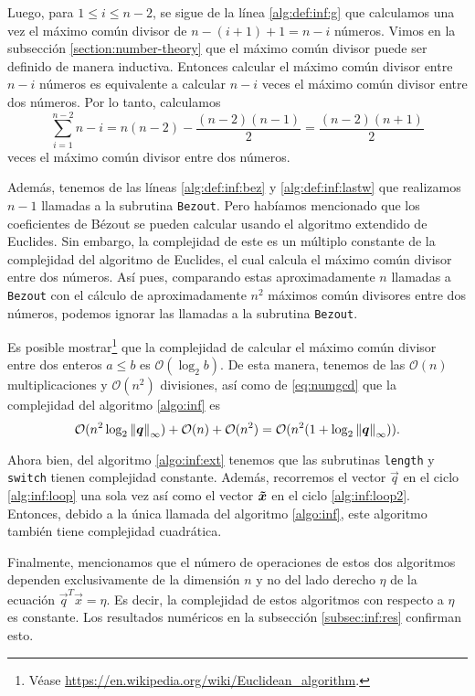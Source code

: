 Luego, para $1 \leq i \leq n - 2$, se sigue de la línea \ref{alg:def:inf:g} que calculamos una vez
el máximo común divisor de $n - (i + 1) + 1 = n - i$ números. Vimos en la subsección
\ref{section:number-theory} que el máximo común divisor puede ser definido de manera inductiva.
Entonces calcular el máximo común divisor entre $n - i$ números es equivalente a calcular $n - i$
veces el máximo común divisor entre dos números. Por lo tanto, calculamos
\begin{equation}
	\label{eq:numgcd}
	\sum_{i=1}^{n-2}n - i = n(n - 2) - \frac{(n-2)(n-1)}{2} = \frac{(n-2)(n+1)}{2}
\end{equation}
veces el máximo común divisor entre dos números.

Además, tenemos de las líneas \ref{alg:def:inf:bez} y \ref{alg:def:inf:lastw} que realizamos $n - 1$
llamadas a la subrutina \texttt{Bezout}. Pero habíamos mencionado que los coeficientes de Bézout se
pueden calcular usando el algoritmo extendido de Euclides. Sin embargo, la complejidad de este es un
múltiplo constante de la complejidad del algoritmo de Euclides, el cual calcula el máximo común
divisor entre dos números. Así pues, comparando estas aproximadamente $n$ llamadas a \texttt{Bezout}
con el cálculo de aproximadamente $n^2$ máximos común divisores entre dos números, podemos ignorar las
llamadas a la subrutina \texttt{Bezout}.

Es posible mostrar\footnote{
	Véase \url{https://en.wikipedia.org/wiki/Euclidean_algorithm}.
}  que la complejidad de calcular el máximo común divisor entre dos enteros $a \leq b$ es
$\mathcal{O}(\log_2 b)$. De esta manera, tenemos de las $\mathcal{O}(n)$ multiplicaciones y
$\mathcal{O}(n^2)$ divisiones, así como de \eqref{eq:numgcd} que la complejidad del algoritmo \ref{algo:inf} es
\begin{equation*}
	\mathcal{O}(n^2\log_2\left\lVert \boldsymbol{q} \right\rVert_\infty) + \mathcal{O}(n) + \mathcal{O}(n^2) =
	\mathcal{O}(n^2(1 + \log_2\left\lVert \boldsymbol{q} \right\rVert_\infty)).
\end{equation*}

Ahora bien, del algoritmo \ref{algo:inf:ext} tenemos que las subrutinas \texttt{length} y
\texttt{switch} tienen complejidad constante. Además, recorremos el vector $\vec{q}$ en el ciclo
\ref{alg:inf:loop} una sola vez así como el vector $\boldsymbol{\tilde{x}}$ en el ciclo \ref{alg:inf:loop2}.
Entonces, debido a la única llamada del algoritmo \ref{algo:inf}, este algoritmo también tiene
complejidad cuadrática.

Finalmente, mencionamos que el número de operaciones de estos dos algoritmos dependen exclusivamente de la
dimensión $n$ y no del lado derecho $\eta$ de la ecuación $\vec{q}^T\vec{x} = \eta$. Es decir, la
complejidad de estos algoritmos con respecto a $\eta$ es constante. Los resultados numéricos en la
subsección \ref{subsec:inf:res} confirman esto.

